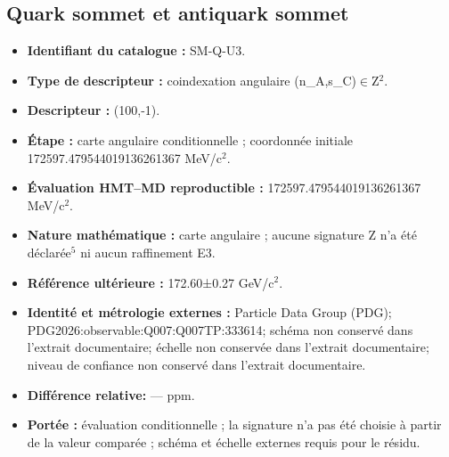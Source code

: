 \subsection{Quark sommet et antiquark sommet}
\begin{itemize}
\item \textbf{Identifiant du catalogue :} SM-Q-U3.
\item \textbf{Type de descripteur :} coindexation angulaire (n\_A,s\_C)\(\in\)Z\({}^{2}\).
\item \textbf{Descripteur :} (100,-1).
\item \textbf{Étape :} carte angulaire conditionnelle ; coordonnée initiale 172597.479544\allowbreak{}019136\allowbreak{}261367 MeV/c\({}^{2}\).
\item \textbf{Évaluation HMT--MD reproductible :} 172597.479544\allowbreak{}019136\allowbreak{}261367 MeV/c\({}^{2}\).
\item \textbf{Nature mathématique :} carte angulaire ; aucune signature Z n’a été déclarée\({}^{5}\) ni aucun raffinement E3.
\item \textbf{Référence ultérieure :} 172.60±\allowbreak{}0.27 GeV/c\({}^{2}\).
\item \textbf{Identité et métrologie externes :} Particle Data Group (PDG); PDG2026:\allowbreak{}observable:\allowbreak{}Q007:\allowbreak{}Q007TP:\allowbreak{}333614; schéma non conservé dans l’extrait documentaire; échelle non conservée dans l’extrait documentaire; niveau de confiance non conservé dans l’extrait documentaire.
\item \textbf{Différence relative:} --- ppm.
\item \textbf{Portée :} évaluation conditionnelle ; la signature n’a pas été choisie à partir de la valeur comparée ; schéma et échelle externes requis pour le résidu.
\end{itemize}
